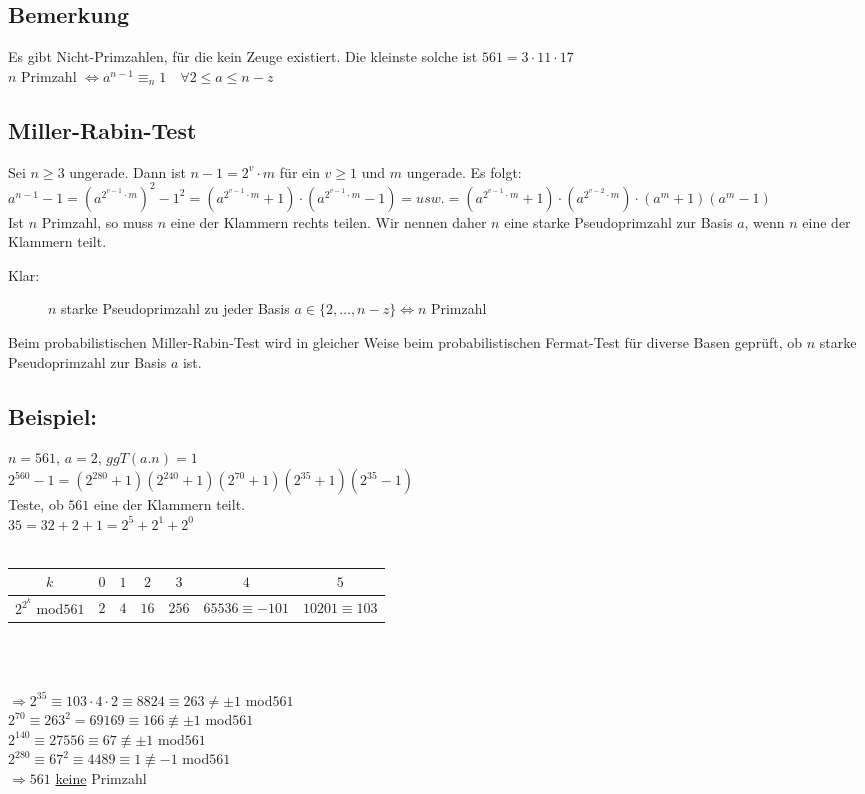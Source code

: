 \subsection{Bemerkung}
Es gibt Nicht-Primzahlen, für die kein Zeuge existiert. Die kleinste solche ist $561 = 3 \cdot 11 \cdot 17$\\
$n$ Primzahl $\Leftrightarrow a^{n-1} \equiv_{n} 1 \quad \forall 2\leq a \leq n-z$
%
%
%
\subsection{Miller-Rabin-Test}
Sei $n \geq 3$ ungerade. Dann ist $n-1 = 2^{v} \cdot m$ für ein $v \geq 1$ und $m$ ungerade. Es folgt: $a^{n-1} - 1 = (a^{2^{v-1} \cdot m})^{2} - 1^{2} = (a^{2^{v-1} \cdot m} + 1) \cdot (a^{2^{v-1} \cdot m} - 1) = usw. = (a^{2^{v-1} \cdot m} + 1) \cdot (a^{2^{v-2} \cdot m}) \cdot (a^{m} + 1) (a^{m} - 1)$\\
Ist $n$ Primzahl, so muss $n$ eine der Klammern rechts teilen. Wir nennen daher $n$ eine starke Pseudoprimzahl zur Basis $a$, wenn $n$ eine der Klammern teilt. 
\begin{description}
	\item[Klar:] $n$ starke Pseudoprimzahl zu jeder Basis $a \in \{2, \dotsc, n-z\} \Leftrightarrow n$ Primzahl
\end{description}
Beim probabilistischen Miller-Rabin-Test wird in gleicher Weise beim probabilistischen Fermat-Test für diverse Basen geprüft, ob $n$ starke Pseudoprimzahl zur Basis $a$ ist. 
%
%
%
\subsection{Beispiel:}
$n = 561$, $a = 2$, $ggT(a.n) = 1$\\
$2^{560} - 1 = (2^{280} + 1)(2^{240} + 1)(2^{70} + 1)(2^{35} + 1)(2^{35} - 1)$\\
Teste, ob $561$ eine der Klammern teilt.\\
$35 = 32 + 2 + 1 = 2^{5} + 2^{1} + 2^{0}$\\
\quad\\
\begin{centering}
	\begin{tabular}{c|c|c|c|c|c|c}
		$k$ & $0$ & $1$ & $2$ & $3$ & $4$ & $5$\\\hline
		$2^{2^{k}}$ mod$561$ & $2$ & $4$ & $16$ & $256$ & $65536 \equiv -101$ & $10201 \equiv 103$\\
	\end{tabular}
\end{centering}
\quad\\
\quad\\
\begin{centering}
	$\Rightarrow 2^{35} \equiv 103 \cdot 4 \cdot 2 \equiv 8824 \equiv 263 \neq  \pm 1$ mod$561$\\
	$2^{70} \equiv 263^{2} = 69169 \equiv 166 \nequiv \pm 1$ mod$561$\\
	$ 2^{140} \equiv 27556 \equiv 67 \nequiv \pm 1$ mod$561$\\
	$2^{280} \equiv 67^{2} \equiv 4489 \equiv 1 \nequiv - 1$ mod$561$\\
	$\Rightarrow 561$ \underline{keine} Primzahl
\end{centering}
%
%
%
